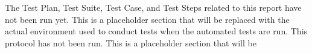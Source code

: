 The Test Plan, Test Suite, Test Case, and Test Steps related to this report have
not been run yet.  This is a placeholder section that will be replaced with the
actual environment used to conduct tests when the automated tests are run.
This protocol has not been run.  This is a placeholder section that will be
